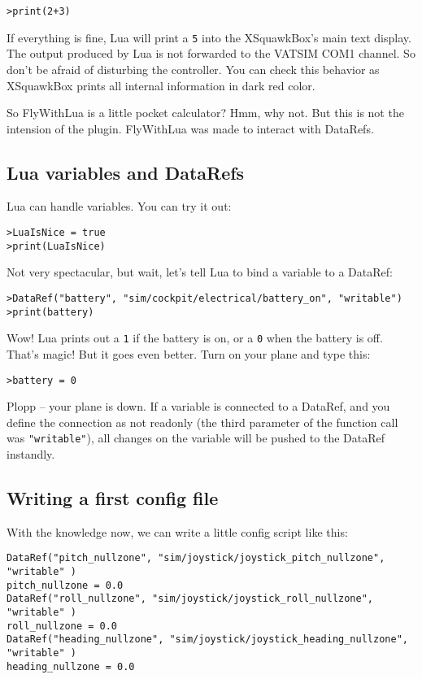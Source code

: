 \documentclass[11pt,parskip=half,a4paper]{scrartcl}
\begin{document}
\verb|>print(2+3)|

If everything is fine, Lua will print a \verb|5| into the XSquawkBox's main text display. The output produced by Lua is not forwarded to the VATSIM COM1 channel. So don't be afraid of disturbing the controller. You can check this behavior as XSquawkBox prints all internal information in dark red color.

So FlyWithLua is a little pocket calculator? Hmm, why not. But this is not the intension of the plugin. FlyWithLua was made to interact with DataRefs.

\subsection{Lua variables and DataRefs}

Lua can handle variables. You can try it out:

\verb|>LuaIsNice = true|\\
\verb|>print(LuaIsNice)|

Not very spectacular, but wait, let's tell Lua to bind a variable to a DataRef:

\verb|>DataRef("battery", "sim/cockpit/electrical/battery_on", "writable")|\\
\verb|>print(battery)|

Wow! Lua prints out a \verb|1| if the battery is on, or a \verb|0| when the battery is off. That's magic! But it goes even better. Turn on your plane and type this:

\verb|>battery = 0|

Plopp -- your plane is down. If a variable is connected to a DataRef, and you define the connection as not readonly (the third parameter of the function call was \verb|"writable"|),
all changes on the variable will be pushed to the DataRef instandly.

\subsection{Writing a first config file}

With the knowledge now, we can write a little config script like this:

\begin{lstlisting}
DataRef("pitch_nullzone", "sim/joystick/joystick_pitch_nullzone", "writable" )
pitch_nullzone = 0.0
DataRef("roll_nullzone", "sim/joystick/joystick_roll_nullzone", "writable" )
roll_nullzone = 0.0
DataRef("heading_nullzone", "sim/joystick/joystick_heading_nullzone", "writable" )
heading_nullzone = 0.0
\end{lstlisting}
\end{document}
